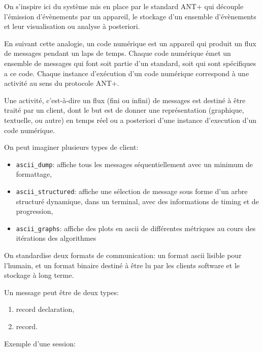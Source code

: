 On s'inspire ici du système mis en place par le standard ANT+ qui
découple l'émission d'évènements par un appareil, le stockage d'un
ensemble d'évènements et leur visualisation ou analyse à posteriori.

En suivant cette analogie, un code numérique est un appareil qui
produit un flux de messages pendant un laps de temps. Chaque code
numérique émet un ensemble de messages qui font soit partie d'un
standard, soit qui sont spécifiques a ce code.
Chaque instance d'exécution d'un code numérique correspond à une
activité au sens du protocole ANT+.

Une activité, c'est-à-dire un flux (fini ou infini) de messages est
destiné à être traité par un client, dont le but est de donner une
représentation (graphique, textuelle, ou autre) en temps réel ou a
posteriori d'une instance d'execution d'un code numérique.

On peut imaginer plusieurs types de client:
\begin{itemize}
\item \texttt{ascii_dump}: affiche tous les messages
  séquentiellement avec un minimum de formattage,
\item \texttt{ascii_structured}: affiche une sélection de message sous
  forme d'un arbre structuré dynamique, dans un terminal, avec des
  informations de timing et de progression,
  \item \texttt{ascii_graphs}: affiche des plots en ascii de
    différentes métriques au cours des itérations des algorithmes
\end{itemize}

On standardise deux formats de communication: un format ascii lisible
pour l'humain, et un format binaire destiné à être lu par les
clients software et le stockage à long terme.

Un message peut être de deux types:
\begin{enumerate}
\item record declaration,
\item record.
\end{enumerate}

Exemple d'une session:
